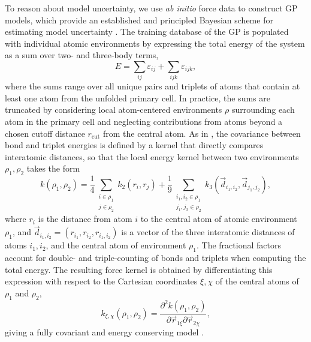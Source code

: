 \documentclass[%
reprint,
superscriptaddress,
amsmath,amssymb,
aps,
prl,
]{revtex4-1}
\begin{document}
To reason about model uncertainty, we use \textit{ab initio} force data to construct GP models, which provide an established and principled Bayesian scheme for estimating model uncertainty \cite{rasmussen2003gaussian}. The training database of the GP is populated with individual atomic environments by expressing the total energy of the system as a sum over two- and three-body terms,
\begin{equation}
E = \sum_{ij} \varepsilon_{ij} + \sum_{ijk} \varepsilon_{ijk},
\label{en_mod}
\end{equation}
where the sums range over all unique pairs and triplets of atoms that contain at least one atom from the unfolded primary cell. In practice, the sums are truncated by considering local atom-centered environments $\rho$ surrounding each atom in the primary cell and neglecting contributions from atoms beyond a chosen cutoff distance $r_{\text{cut}}$ from the central atom. As in \cite{glielmo2018efficient}, the covariance between bond and triplet energies is defined by a kernel that directly compares interatomic distances, so that the local energy kernel between two environments $\rho_1, \rho_2$ takes the form
\begin{equation}
k(\rho_1, \rho_2) = \frac{1}{4} \sum\limits_{\substack{i\in\rho_1 \\ j\in\rho_2}}k_2(r_i, r_j) + \frac{1}{9} \sum\limits_{\substack{i_1, i_2 \in \rho_1 \\ j_1, j_2 \in \rho_2}} k_3(\vec{d}_{i_1, i_2}, \vec{d}_{j_1, j_2}),
\end{equation}
where $r_i$ is the distance from atom $i$ to the central atom of atomic environment $\rho_1$, and $\vec{d}_{i_1, i_2} = (r_{i_1}, r_{i_2}, r_{i_1, i_2})$ is a vector of the three interatomic distances of atoms $i_1, i_2$, and the central atom of environment $\rho_1$. The fractional factors account for double- and triple-counting of bonds and triplets when computing the total energy. The resulting force kernel is obtained by differentiating this expression with respect to the Cartesian coordinates $\xi, \chi$ of the central atoms of $\rho_1$ and $\rho_2$,
\begin{equation}
k_{\xi,\chi}(\rho_1, \rho_2) = \frac{\partial^2 k(\rho_1, \rho_2)}{\partial \vec{r}_{1\xi} \partial \vec{r}_{2\chi}},
\end{equation}
giving a fully covariant and energy conserving model \cite{glielmo2017accurate, glielmo2018efficient, chmiela2017machine}.
\end{document}
